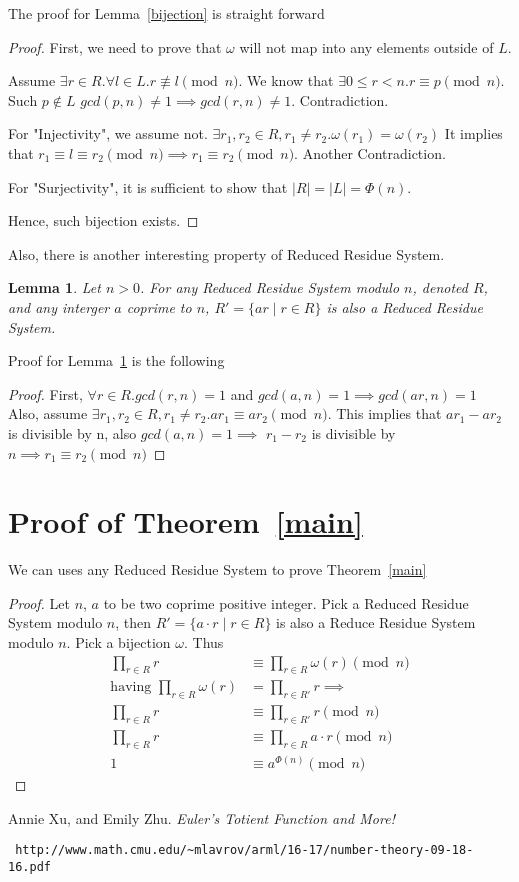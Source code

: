 \documentclass[12pt,a4paper]{amsart}
\numberwithin{equation}{section}
\theoremstyle{plain}
\newtheorem{Lemma}[Th]{Lemma}
\theoremstyle{definition}
\begin{document}
The proof for Lemma~\ref{bijection} is straight forward
\begin{proof}
    First, we need to prove that $\omega$ will not map into
    any elements outside of $L$.

    Assume $\exists r \in R.\forall l \in L. r \not\equiv l \pmod n$.
    We know that $\exists 0 \leq r < n. r \equiv p \pmod n$. Such $p \not\in L$
    $gcd(p, n) \neq 1 \implies gcd(r, n) \neq 1$. Contradiction.

    For "Injectivity", we assume not. $\exists r_1, r_2 \in R, r_1 \neq r_2. \omega(r_1) = \omega(r_2)$
    It implies that $r_1 \equiv l \equiv r_2 \pmod n \implies r_1 \equiv r_2 \pmod n$. Another Contradiction.

    For "Surjectivity", it is sufficient to show that $\left\vert{R}\right\vert = \left\vert{L}\right\vert = \Phi(n)$.
    
    Hence, such bijection exists.
\end{proof}

Also, there is another interesting property of Reduced Residue System.

\begin{Lemma} \label{multiplicity} Let $n > 0$. For any Reduced Residue System
    modulo $n$, denoted $R$, and any interger $a$ coprime to $n$, $R' = \{a r \mid r \in R\}$ is also
    a Reduced Residue System.
\end{Lemma}
Proof for Lemma~\ref{multiplicity} is the following
\begin{proof}
    First, $\forall r \in R. gcd(r, n) = 1$ and $gcd(a, n) = 1 \implies gcd(a r, n) = 1$
    Also, assume $\exists r_1, r_2 \in R, r_1 \neq r_2. a r_1 \equiv a r_2 \pmod n$. This implies
    that $a r_1 - a r_2$ is divisible by n, also $gcd(a, n) = 1 \implies$
    $r_1 - r_2$ is divisible by $n \implies r_1 \equiv r_2 \pmod n$
\end{proof}

\section{Proof of Theorem~\ref{main}}
We can uses any Reduced Residue System to prove Theorem~\ref{main}
\begin{proof}
    Let $n$, $a$ to be two coprime positive integer. Pick a Reduced Residue System modulo $n$,
    then $R' = \{ a \cdot r \mid r \in R \}$ is also a Reduce Residue System modulo $n$. Pick a
    bijection $\omega$. Thus
    \begin{align*}
        \prod_{r \in R} r &\equiv \prod_{r \in R} \omega(r) \pmod n \\
        \text{having } \prod_{r \in R} \omega(r) &= \prod_{r \in R'} r \implies \\
        \prod_{r \in R} r &\equiv \prod_{r \in R'} r \pmod n \\
        \prod_{r \in R} r &\equiv \prod_{r \in R } a \cdot r \pmod n \\
        1 &\equiv a^{\Phi(n)} \pmod n
    \end{align*}
\end{proof}

\begin{thebibliography}{99} 
        Annie Xu, and Emily Zhu.
        \textit{Euler's Totient Function and More!}
        \begin{verbatim} http://www.math.cmu.edu/~mlavrov/arml/16-17/number-theory-09-18-16.pdf
        \end{verbatim}
\end{thebibliography}
\end{document}
